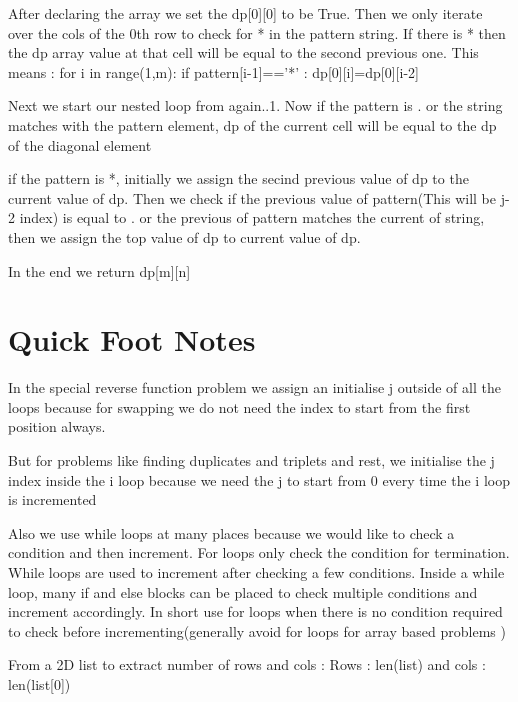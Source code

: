 \documentclass{article}
\newcommand{\nd}{\noindent}
\begin{document}
\nd After declaring the array we set the dp[0][0] to be True. Then we only iterate over the cols of the 0th row to check for * in the pattern string. If there is * then the dp array value at that cell will be equal to the second previous one. This means : for i in range(1,m): if pattern[i-1]=='*' : dp[0][i]=dp[0][i-2]  

\nd Next we start our nested loop from again..1. Now if the pattern is . or the string matches with the pattern element, dp of the current cell will be equal to the dp of the diagonal element 

\nd if the pattern is *, initially we assign the secind previous value of dp to the current value of dp. Then we check if the previous value of pattern(This will be j-2 index) is equal to . or the previous of pattern matches the current of string, then we assign the top value of dp to current value of dp. 

\nd In the end we return dp[m][n]


\section{Quick Foot Notes}
In the special reverse function problem we assign an initialise j outside of all the loops because for swapping we do not need the index to start from the first position always. 

\nd But for problems like finding duplicates and triplets and rest, we initialise the j index inside the i loop because we need the j to start from 0 every time the i loop is incremented

\nd Also we use while loops at many places because we would like to check a condition and then increment. For loops only check the condition for termination. While loops are used to increment after checking a few conditions. Inside a while loop, many if and else blocks can be placed to check multiple conditions and increment accordingly. In short use for loops when there is no condition required to check before incrementing(generally avoid for loops for array based problems )

\nd From a 2D list to extract number of rows and cols : Rows : len(list) and cols : len(list[0])
\end{document}
